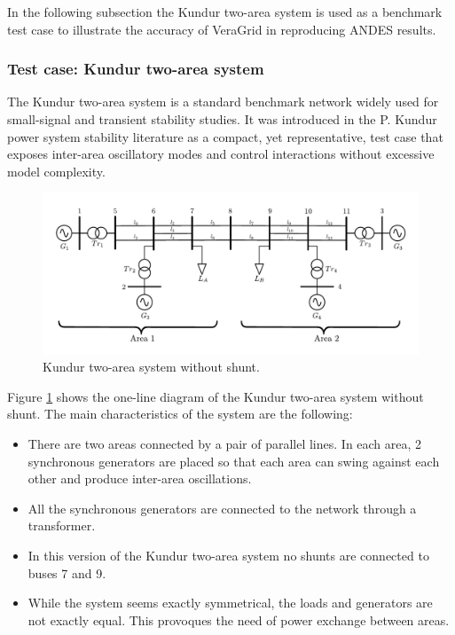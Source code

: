 In the following subsection the Kundur two-area system is used as a benchmark test case to illustrate the accuracy of VeraGrid in reproducing ANDES results.


\subsubsection{Test case: Kundur two-area system}

The Kundur two-area system is a standard benchmark network widely used for small-signal and transient stability studies.
 It was introduced in the P. Kundur power system stability literature \cite{StabilityAndControlKundur} as a compact, yet representative, test case that exposes 
 inter-area oscillatory modes and control interactions without excessive model complexity.

\begin{figure}[h!]
    \centering
    \includegraphics[width=1\linewidth]{inkscape_svg/Kundur_system_no_shunt.pdf}
    \caption{Kundur two-area system without shunt.}
    \label{fig:kundur_system}
\end{figure}

Figure \ref{fig:kundur_system} shows the one-line diagram of the Kundur two-area system without shunt. The main characteristics of the system are the following:
\begin{itemize}
    \item There are two areas connected by a pair of parallel lines. In each area, 2 synchronous generators are placed so that each area can swing against 
    each other and produce inter-area oscillations.
    \item All the synchronous generators are connected to the network through a transformer.
    \item In this version of the Kundur two-area system no shunts are connected to buses 7 and 9.
    \item While the system seems exactly symmetrical, the loads and generators are not exactly equal. This provoques the need of power exchange between areas.
\end{itemize}

